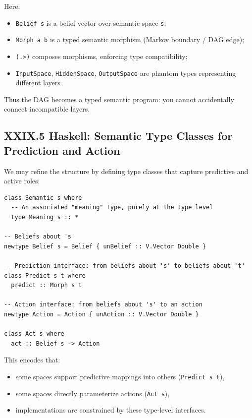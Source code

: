 \documentclass[11pt,letterpaper]{article}
\begin{document}
Here:

\begin{itemize}
  \item \verb|Belief s| is a belief vector over semantic space \verb|s|;
  \item \verb|Morph a b| is a typed semantic morphism (Markov boundary / DAG edge);
  \item \verb|(.>)| composes morphisms, enforcing type compatibility;
  \item \verb|InputSpace|, \verb|HiddenSpace|, \verb|OutputSpace| are phantom types representing different layers.
\end{itemize}

Thus the DAG becomes a typed semantic program: you cannot accidentally connect incompatible layers.

\subsection{XXIX.5 Haskell: Semantic Type Classes for Prediction and Action}

We may refine the structure by defining type classes that capture predictive and active roles:

\begin{verbatim}
class Semantic s where
  -- An associated "meaning" type, purely at the type level
  type Meaning s :: *

-- Beliefs about 's'
newtype Belief s = Belief { unBelief :: V.Vector Double }

-- Prediction interface: from beliefs about 's' to beliefs about 't'
class Predict s t where
  predict :: Morph s t

-- Action interface: from beliefs about 's' to an action
newtype Action = Action { unAction :: V.Vector Double }

class Act s where
  act :: Belief s -> Action
\end{verbatim}

This encodes that:

\begin{itemize}
  \item some spaces support predictive mappings into others (\verb|Predict s t|),
  \item some spaces directly parameterize actions (\verb|Act s|),
  \item implementations are constrained by these type-level interfaces.
\end{itemize}
\end{document}

